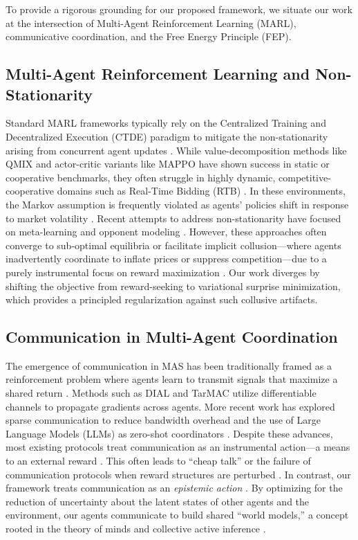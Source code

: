 To provide a rigorous grounding for our proposed framework, we situate our work at the intersection of Multi-Agent Reinforcement Learning (MARL), communicative coordination, and the Free Energy Principle (FEP).

\subsection{Multi-Agent Reinforcement Learning and Non-Stationarity}
Standard MARL frameworks typically rely on the Centralized Training and Decentralized Execution (CTDE) paradigm to mitigate the non-stationarity arising from concurrent agent updates \cite{lowe2017multi, rashid2018qmix}. While value-decomposition methods like QMIX \cite{rashid2018qmix} and actor-critic variants like MAPPO \cite{yu2022surprising} have shown success in static or cooperative benchmarks, they often struggle in highly dynamic, competitive-cooperative domains such as Real-Time Bidding (RTB) \cite{zhao2024adaptive}. In these environments, the Markov assumption is frequently violated as agents' policies shift in response to market volatility \cite{papoudakis2021benchmarking}. Recent attempts to address non-stationarity have focused on meta-learning \cite{al-shedivat2018continuous} and opponent modeling \cite{xie2024learning}. However, these approaches often converge to sub-optimal equilibria or facilitate implicit collusion—where agents inadvertently coordinate to inflate prices or suppress competition—due to a purely instrumental focus on reward maximization \cite{calvano2020artificial, schut2024collusion}. Our work diverges by shifting the objective from reward-seeking to variational surprise minimization, which provides a principled regularization against such collusive artifacts.

\subsection{Communication in Multi-Agent Coordination}
The emergence of communication in MAS has been traditionally framed as a reinforcement problem where agents learn to transmit signals that maximize a shared return \cite{foerster2016learning, sukhbaatar2016learning}. Methods such as DIAL \cite{foerster2016learning} and TarMAC \cite{das2019tarmac} utilize differentiable channels to propagate gradients across agents. More recent work has explored sparse communication to reduce bandwidth overhead \cite{wang2024survey} and the use of Large Language Models (LLMs) as zero-shot coordinators \cite{shinn2024reflexion, zhang2024proagent}. Despite these advances, most existing protocols treat communication as an instrumental action—a means to an external reward \cite{hu2024towards}. This often leads to ``cheap talk'' or the failure of communication protocols when reward structures are perturbed \cite{sharma2017learning}. In contrast, our framework treats communication as an \textit{epistemic action} \cite{parrill_epistemic_2023}. By optimizing for the reduction of uncertainty about the latent states of other agents and the environment, our agents communicate to build shared ``world models,'' a concept rooted in the theory of minds and collective active inference \cite{friston2024collective}.

